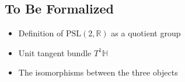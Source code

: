 \subsection{To Be Formalized}
\begin{itemize}
\item Definition of $\mathrm{PSL}(2,\mathbb{R})$ as a quotient group
\item Unit tangent bundle $T^1\mathbb{H}$
\item The isomorphisms between the three objects
\end{itemize}
